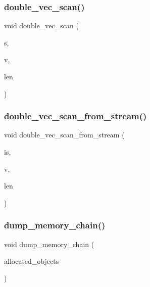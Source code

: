 \mbox{\label{util_8_c_a31ec307236a2ca8190bcb8e9637b132b}} 
\subsubsection{\texorpdfstring{double\+\_\+vec\+\_\+scan()}{double\_vec\_scan()}}
{\footnotesize\ttfamily void double\+\_\+vec\+\_\+scan (\begin{DoxyParamCaption}\item[{const \mbox{\hyperlink{galois_8h_ab6cc7b4aeb6ea31aba2b3fbfc83ff5e6}{B\+Y\+TE}} $\ast$}]{s,  }\item[{double $\ast$\&}]{v,  }\item[{\mbox{\hyperlink{galois_8h_a09fddde158a3a20bd2dcadb609de11dc}{I\+NT}} \&}]{len }\end{DoxyParamCaption})}

\mbox{\label{util_8_c_a697ad822dac70e095d5f26906069880d}} 
\subsubsection{\texorpdfstring{double\+\_\+vec\+\_\+scan\+\_\+from\+\_\+stream()}{double\_vec\_scan\_from\_stream()}}
{\footnotesize\ttfamily void double\+\_\+vec\+\_\+scan\+\_\+from\+\_\+stream (\begin{DoxyParamCaption}\item[{istream \&}]{is,  }\item[{double $\ast$\&}]{v,  }\item[{\mbox{\hyperlink{galois_8h_a09fddde158a3a20bd2dcadb609de11dc}{I\+NT}} \&}]{len }\end{DoxyParamCaption})}

\mbox{\label{util_8_c_ae2cdf38eb2c3931ca790aa18a1231aea}} 
\subsubsection{\texorpdfstring{dump\+\_\+memory\+\_\+chain()}{dump\_memory\_chain()}}
{\footnotesize\ttfamily void dump\+\_\+memory\+\_\+chain (\begin{DoxyParamCaption}\item[{void $\ast$}]{allocated\+\_\+objects }\end{DoxyParamCaption})}

